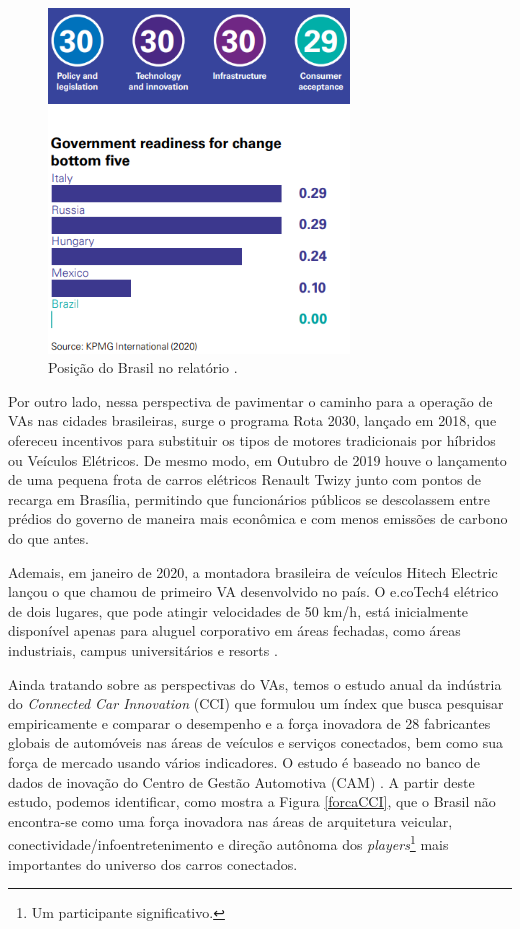 \begin{figure}[H]
\centering
\includegraphics[width=8cm]{Figures/rank30.png}
\caption{Posição do Brasil no relatório \cite{KPMG}.}
\label{rank30}
\end{figure}

Por outro lado, nessa perspectiva de pavimentar o caminho para a operação de VAs nas cidades brasileiras, surge o programa Rota 2030, lançado em 2018, que ofereceu incentivos para substituir os tipos de motores tradicionais por híbridos ou Veículos Elétricos. De mesmo modo, em Outubro de 2019 houve o lançamento de uma pequena frota de carros elétricos Renault Twizy junto com pontos de recarga em Brasília, permitindo que funcionários públicos se descolassem entre prédios do governo de maneira mais econômica e com menos emissões de carbono do que antes.

Ademais, em janeiro de 2020, a montadora brasileira de veículos Hitech Electric lançou o que chamou de primeiro VA desenvolvido no país. O e.coTech4 elétrico de dois lugares, que pode atingir velocidades de 50 km/h, está inicialmente disponível apenas para aluguel corporativo em áreas fechadas, como áreas industriais, campus universitários e resorts \cite{KPMG}.


Ainda tratando sobre as perspectivas do VAs, temos o estudo anual da indústria do \textit{Connected Car Innovation} (CCI) que formulou um índex que busca pesquisar empiricamente e comparar o desempenho e a força inovadora de 28 fabricantes globais de automóveis nas áreas de veículos e serviços conectados, bem como sua força de mercado usando vários indicadores. O estudo é baseado no banco de dados de inovação do Centro de Gestão Automotiva (CAM) \cite{CCI}. A partir deste estudo, podemos identificar, como mostra a Figura \ref{forcaCCI}, que o Brasil não encontra-se como uma força inovadora nas áreas de arquitetura veicular, conectividade/infoentretenimento e direção autônoma dos \textit{players}\footnote{Um participante significativo.} mais importantes do universo dos carros conectados.


